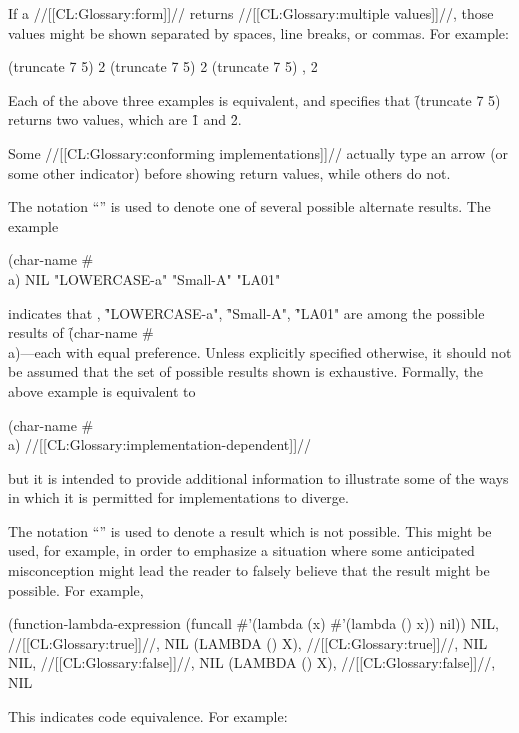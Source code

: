 If a //[[CL:Glossary:form]]// returns //[[CL:Glossary:multiple values]]//, those values might
be shown separated by spaces, line breaks, or commas.
For example:

\code
 (truncate 7 5)
 2
 (truncate 7 5) 
   2
 (truncate 7 5)
, 2
\endcode

Each of the above three examples is equivalent, and specifies
that \f{(truncate 7 5)} returns two values, which are \f{1} and \f{2}.

Some //[[CL:Glossary:conforming implementations]]// actually type an arrow (or some
other indicator) before showing return values, while others do not.

\itemitem{\OV}

The notation ``{\OV}'' is used to denote one of several possible
alternate results.  The example

\code
 (char-name #\\a)
\EV NIL
\OV "LOWERCASE-a"
\OV "Small-A"
\OV "LA01"
\endcode

indicates that \nil, \f{"LOWERCASE-a"}, \f{"Small-A"}, \f{"LA01"} are
among the possible results of \f{(char-name \#\\a)}---each with equal preference.
Unless explicitly specified otherwise, it should not be assumed that the set of possible 
results shown is exhaustive.
Formally, the above example is equivalent to

\code
 (char-name #\\a) \EV //[[CL:Glossary:implementation-dependent]]//
\endcode

but it is intended to provide additional information to illustrate some
of the ways in which it is permitted for implementations to diverge.

\itemitem{\NV}

The notation ``{\NV}'' is used to denote a result which is not possible.
This might be used, for example, in order to emphasize a situation where
some anticipated misconception might lead the reader to falsely believe
that the result might be possible.  For example,

\code
 (function-lambda-expression 
    (funcall #'(lambda (x) #'(lambda () x)) nil))
\EV NIL, //[[CL:Glossary:true]]//, NIL
\OV (LAMBDA () X), //[[CL:Glossary:true]]//, NIL
\NV NIL, //[[CL:Glossary:false]]//, NIL
\NV (LAMBDA () X), //[[CL:Glossary:false]]//, NIL
\endcode


\itemitem{\EQ} 

This indicates code equivalence. For example:

